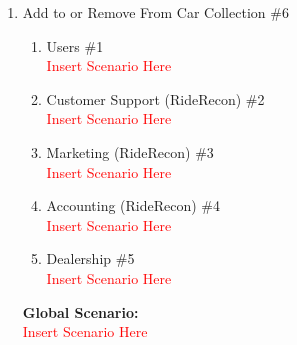 \documentclass[]{article}
\begin{document}
\begin{enumerate}[label={\bf BE\arabic*.}]
\begin{enumerate}[label=\textbf{VP\arabic*.}]
				\textcolor{red}{4. The Finalizer displays the make and model of the car, as well as the fun fact and where to purchase the car.} \\
				\textbf{Secondary Scenario} \\
				\textcolor{red}{1i. User doesn't have both forms of input.} \\
				\textcolor{red}{1ii. Available form of input is given to the Expderts which will do their best to determine the car.} \\
				\textcolor{red}{3i. The Experts come to different conclusions about the make and model of the car.} \\
				\textcolor{red}{4i. The Finalizer displays all Expert answers, with a recommendation on which is most likely based on how many Experts came to the same conclusion.} \\
				\textcolor{red}{4ii. The Finalizer also obtains fun facts and purchase information about ALL cars that the Experts concluded on.} \\
				
			\item Customer Support (RideRecon) \#2 \\
				\textcolor{red}{Insert Scenario Here}
			\item Marketing (RideRecon) \#3 \\
				\textcolor{red}{Insert Scenario Here}
			\item Accounting (RideRecon) \#4 \\
				\textcolor{red}{Insert Scenario Here}
			\item Dealership \#5 \\
				\textcolor{red}{Insert Scenario Here}
		\end{enumerate}
		{\bf Global Scenario:}\\
		\textcolor{red}{Insert Scenario Here}
	\item Add to or Remove From Car Collection \#6
	\begin{enumerate}[label={\bf VP\arabic*.}]
		\item Users \#1 \\
			\textcolor{red}{Insert Scenario Here}
		\item Customer Support (RideRecon) \#2 \\
			\textcolor{red}{Insert Scenario Here}
		\item Marketing (RideRecon) \#3 \\
			\textcolor{red}{Insert Scenario Here}
		\item Accounting (RideRecon) \#4 \\
			\textcolor{red}{Insert Scenario Here}
		\item Dealership \#5 \\
			\textcolor{red}{Insert Scenario Here}
	\end{enumerate}
	{\bf Global Scenario:}\\
	\textcolor{red}{Insert Scenario Here}
\end{enumerate}
\end{document}
